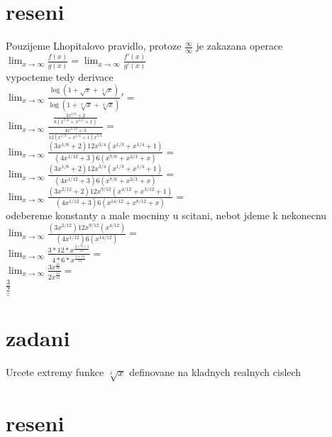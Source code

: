 \documentclass[a4paper]{article}
\def\doubleunderline#1{\underline{\underline{#1}}}
\begin{document}
\section*{reseni}
Pouzijeme Lhopitalovo pravidlo, protoze $\frac{\infty}{\infty}$ je zakazana operace\\
$
\lim_{x \rightarrow \infty} \frac{f(x)}{g(x)} = 
\lim_{x \rightarrow \infty} \frac{f'(x)}{g'(x)}
$\\
vypocteme tedy derivace\\
$
\lim_{x \rightarrow \infty} \frac{
	\log(1+\sqrt{x}+\sqrt[3]{x})
}{
	\log(1+\sqrt[3]{x}+\sqrt[4]{x})
}' =
$\\
$
\lim_{x \rightarrow \infty} \frac{
	\frac{
		3x^{1/6} + 2
	}{
		6(x^{7/6} + x^{2/3} + x)
	}
}{
	\frac{
		4 x^{1/12} + 3
	}{
		12 (x^{1/3} + x^{1/4} + 1) x^{3/4}
	}
} =
$\\
$
\lim_{x \rightarrow \infty} \frac{
	(3x^{1/6}+2)12x^{3/4}(x^{1/3}+x^{1/4}+1)
}{
	(4x^{1/12}+3)6(x^{7/6}+x^{2/3}+x)	
} =
$\\
$
\lim_{x \rightarrow \infty} \frac{
	(3x^{1/6}+2)12x^{3/4}(x^{1/3}+x^{1/4}+1)
}{
	(4x^{1/12}+3)6(x^{7/6}+x^{2/3}+x)	
} =
$\\
$
\lim_{x \rightarrow \infty} \frac{
	(3x^{2/12}+2)12x^{9/12}(x^{4/12}+x^{3/12}+1)
}{
	(4x^{1/12}+3)6(x^{14/12}+x^{8/12}+x)	
} =
$\\
odebereme konstanty a male mocniny u scitani, nebot jdeme k nekonecnu\\
$
\lim_{x \rightarrow \infty} \frac{
	(3x^{2/12})  12x^{9/12}   (x^{4/12})
}{
	(4x^{1/12}) 6 (x^{14/12})	
} =
$\\
$
\lim_{x \rightarrow \infty} \frac{
	3*12*x^\frac{2+9+4}{12}
}{
	4*6*x^\frac{1+14}{12}	
} =
$\\
$
\lim_{x \rightarrow \infty} \frac{
	3x^\frac{15}{12}
}{
	2x^\frac{15}{12}	
} =
$\\
$
\doubleunderline{\frac{3}{2}}
$\\









\section*{zadani}
Urcete extremy funkce
$\sqrt[x]{x}$
definovane na kladnych realnych cislech

\section*{reseni}
\end{document}
